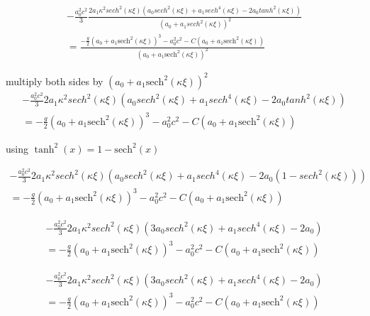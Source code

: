 \documentclass[subeqn]{article}
\begin{document}
\begin{multline*}
- \frac{a_0^2 c^2}{3}\frac{2 a_1 \kappa^2 sech^2(\kappa \xi) \left(a_0 sech^2(\kappa \xi) + a_1 sech^4(\kappa \xi) - 2 a_0 tanh^2(\kappa \xi) \right)}{(a_0 + a_1 sech^2(\kappa \xi))^2} \\
= \frac{-\frac{g}{2} \left(a_0 + a_1\text{sech}^2\left( \kappa \xi\right) \right)^3 - a_0^2 c^2 - C \left(a_0 + a_1\text{sech}^2\left( \kappa \xi\right) \right)}{\left(a_0 + a_1\text{sech}^2\left( \kappa \xi\right) \right) ^2}
\end{multline*}

multiply both sides by $\left(a_0 + a_1\text{sech}^2\left( \kappa \xi\right) \right) ^2$
 \begin{multline*}
- \frac{a_0^2 c^2}{3}{2 a_1 \kappa^2 sech^2(\kappa \xi) \left(a_0 sech^2(\kappa \xi) + a_1 sech^4(\kappa \xi) - 2 a_0 tanh^2(\kappa \xi) \right)} \\
 = {-\frac{g}{2} \left(a_0 + a_1\text{sech}^2\left( \kappa \xi\right) \right)^3 - a_0^2 c^2 - C \left(a_0 + a_1\text{sech}^2\left( \kappa \xi\right) \right)}
 \end{multline*}
 
 using $\tanh^2(x) = 1 - \text{sech}^2(x)$
 
  \begin{multline*}
- \frac{a_0^2 c^2}{3}{2 a_1 \kappa^2 sech^2(\kappa \xi) \left(a_0 sech^2(\kappa \xi) + a_1 sech^4(\kappa \xi) - 2 a_0 \left(1 - sech^2(\kappa \xi) \right) \right)} \\
 = {-\frac{g}{2} \left(a_0 + a_1\text{sech}^2\left( \kappa \xi\right) \right)^3 - a_0^2 c^2 - C \left(a_0 + a_1\text{sech}^2\left( \kappa \xi\right) \right)}
 \end{multline*}
 
   \begin{multline*}
 - \frac{a_0^2 c^2}{3}{2 a_1 \kappa^2 sech^2(\kappa \xi) \left(3a_0 sech^2(\kappa \xi) + a_1 sech^4(\kappa \xi)- 2a_0 \right)} \\
 = {-\frac{g}{2} \left(a_0 + a_1\text{sech}^2\left( \kappa \xi\right) \right)^3 - a_0^2 c^2 - C \left(a_0 + a_1\text{sech}^2\left( \kappa \xi\right) \right)}
 \end{multline*}
 
    \begin{multline*}
 - \frac{a_0^2 c^2}{3}{2 a_1 \kappa^2 sech^2(\kappa \xi) \left(3a_0 sech^2(\kappa \xi) + a_1 sech^4(\kappa \xi)- 2a_0 \right)} \\
 = {-\frac{g}{2} \left(a_0 + a_1\text{sech}^2\left( \kappa \xi\right) \right)^3 - a_0^2 c^2 - C \left(a_0 + a_1\text{sech}^2\left( \kappa \xi\right) \right)}
 \end{multline*}
 
\end{document}
